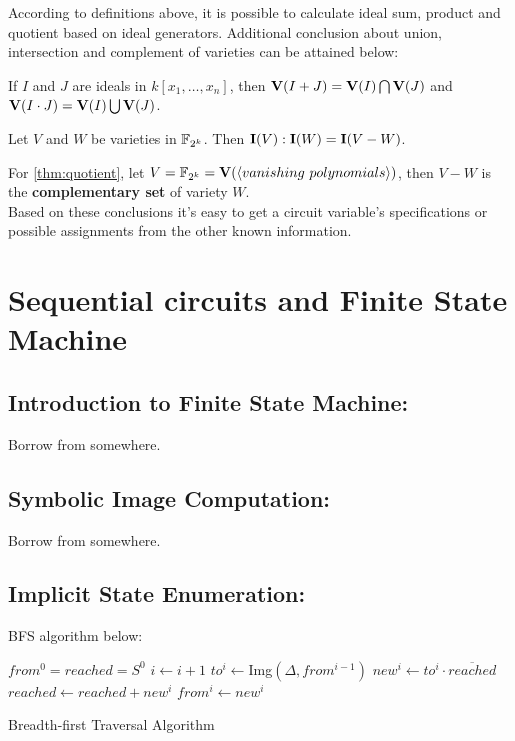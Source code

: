 According to definitions above, it is possible to calculate ideal sum, product and 
quotient based on ideal generators. Additional conclusion about union, 
intersection and complement of varieties can be attained below: \\

\begin{Theorem}
\label{thm:unionintersect}
If $I$ and $J$ are ideals in $k[x_1, \dots, x_n]$, then ${\bf V}(I + J) = {\bf V}(I)
\bigcap {\bf V}(J)$ and ${\bf V}(I \cdot J) = {\bf V}(I) \bigcup {\bf V}(J)$.
\end{Theorem}

\begin{Theorem}
\label{thm:quotient}
Let $V$ and $W$ be varieties in ${\mathbb{F}}_{2^k}$. Then ${\bf I}(V) : {\bf I}(W) = 
{\bf I}(V - W)$.
\end{Theorem}

For \ref{thm:quotient}, let $V = {\mathbb{F}}_{2^k} = {\bf V}(\langle vanishing \  polynomials
\rangle)$, then $V - W$ is the \textbf{complementary set} of variety $W$.\\

Based on these conclusions it's easy to get a circuit variable's specifications
or possible assignments from the other known information.





\section{Sequential circuits and Finite State Machine}
\label{sec:fsm}
\subsection{Introduction to Finite State Machine:}
Borrow from somewhere.
\subsection{Symbolic Image Computation:}
Borrow from somewhere.
\subsection{Implicit State Enumeration:}
BFS algorithm below:
\begin{algorithm}[hbt]
\SetAlgoNoLine

  $from^0 = reached = S^0$\;
  {
  	$i \gets i + 1$\;
	$to^i \gets$Img$(\Delta, from^{i-1})$\;
	$new^i \gets to^i \cdot \overline{reached}$\;
  	$reached \gets reached + new^i$\;
	$from^i \gets new^i$\;
  }
\caption {Breadth-first Traversal Algorithm}\label{alg:gb}
\end{algorithm}





